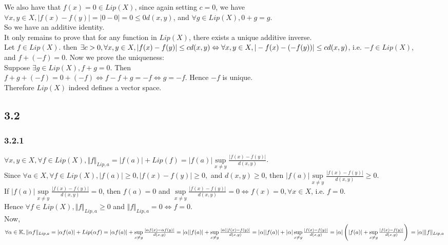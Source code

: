 \documentclass[12pt,a4paper]{article}
\newcommand{\K}{\mathbb{K}}
\theoremstyle{plain}
\theoremstyle{remark}
\theoremstyle{definition}
\begin{document}
We also have that $f(x) = 0 \in Lip(X)$, since again setting $c = 0$, we have\\
$\forall x,y \in X, \vert f(x) - f(y) \vert = \vert 0 - 0 \vert = 0 \le 0d(x,y)$, and $\forall g \in Lip(X), 0 + g = g$.\\
So we have an additive identity.\\

It only remains to prove that for any function in $Lip(X)$, there exists a unique additive inverse.\\
Let $f \in Lip(X)$. then $\exists c >0, \forall x,y \in X, \vert f(x) - f(y) \vert \le cd(x,y)\\
\Leftrightarrow \forall x,y \in X, \vert -f(x) - (-f(y)) \vert \le cd(x,y)$, i.e. $-f \in Lip(X)$,\\
and $f + (-f) = 0$. Now we prove the uniqueness:\\
Suppose $\exists g \in Lip(X), f+g=0$. Then\\
$f+g+(-f) = 0 + (-f) \Longleftrightarrow f-f+g = -f \Longleftrightarrow g = -f$. Hence $-f$ is unique.\\

Therefore $Lip(X)$ indeed defines a vector space.

\pagebreak
\subsection*{3.2}
\subsubsection*{3.2.1}
$\forall x,y \in X, \forall f \in Lip(X), \Vert f \Vert_{Lip,a} = \vert f(a) \vert + Lip(f) = \vert f(a) \vert \sup\limits_{x\neq y} \frac{\vert f(x) - f(y) \vert}{d(x,y)}$.\\
Since $\forall a \in X, \forall f \in Lip(X), \vert f(a) \vert \ge 0, \vert f(x) - f(y) \vert \ge 0,$ and $d(x,y) \ge 0$, then $\vert f(a) \vert \sup\limits_{x\neq y} \frac{\vert f(x) - f(y) \vert}{d(x,y)} \ge 0$.\\
If $\vert f(a) \vert \sup\limits_{x\neq y} \frac{\vert f(x) - f(y) \vert}{d(x,y)} = 0$, then $f(a) = 0$ and $\sup\limits_{x\neq y} \frac{\vert f(x) - f(y) \vert}{d(x,y)} = 0 \Leftrightarrow f(x) = 0, \forall x \in X$, i.e. $f = 0$.\\
Hence $\forall f \in Lip(X), \Vert f \Vert_{Lip,a} \ge 0$ and $\Vert f \Vert_{Lip,a} = 0 \Leftrightarrow f = 0$.\\

\noindent Now, $\forall \alpha \in \K, \Vert \alpha f \Vert_{Lip,a} = \vert \alpha f(a) \vert + Lip(\alpha f) = \vert \alpha f(a) \vert + \sup\limits_{x\neq y}\frac{\vert \alpha f(x) - \alpha f(y)\vert}{d(x,y)} \\
= \vert \alpha \vert \vert f(a) \vert + \sup\limits_{x\neq y} \frac{\vert \alpha \vert \vert f(x) - f(y) \vert}{d(x,y)} = \vert \alpha \vert \vert f(a) \vert + \vert \alpha \vert \sup\limits_{x\neq y}\frac{\vert f(x) - f(y)\vert}{d(x,y)} = \vert \alpha \vert \left(\vert f(a) \vert + \sup\limits_{x\neq y}\frac{\vert f(x) - f(y)\vert}{d(x,y)}\right)\\
= \vert \alpha \vert \Vert f \Vert_{Lip,a}$ \\
\end{document}

